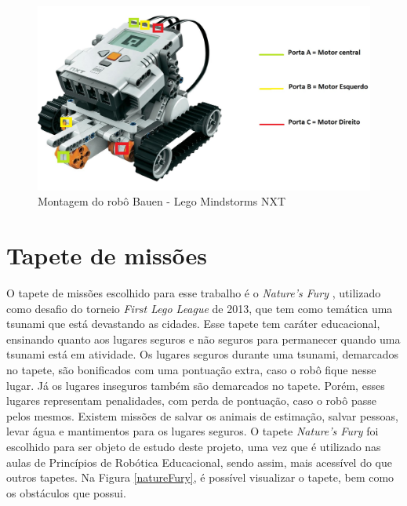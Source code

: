 \FloatBarrier
\begin{figure}[!h]
\centering
\includegraphics[keepaspectratio=true,scale=0.15]{figuras/bauen.jpg}
\caption{Montagem do robô Bauen - Lego Mindstorms NXT}
\label{bauen}
\end{figure}


\section{Tapete de missões} \label{tapeteDeMissoes}
O tapete de missões escolhido para esse trabalho é o \textit{Nature's Fury} \cite{challengeFury}, utilizado como desafio do torneio \textit{First Lego League} de 2013, que tem como temática uma tsunami que está devastando as cidades. Esse tapete tem caráter educacional, ensinando quanto aos lugares seguros e não seguros para permanecer quando uma tsunami está em atividade. Os lugares seguros durante uma tsunami, demarcados no tapete, são bonificados com uma pontuação extra, caso o robô fique nesse lugar. Já os lugares inseguros também são demarcados no tapete. Porém, esses lugares representam penalidades, com perda de pontuação, caso o robô passe pelos mesmos. Existem missões de salvar os animais de estimação, salvar pessoas, levar água e mantimentos para os lugares seguros.
O tapete \textit{Nature's Fury} foi escolhido para ser objeto de estudo deste projeto, uma vez que é utilizado nas aulas de Princípios de Robótica Educacional, sendo assim, mais acessível do que outros tapetes. Na Figura \ref{natureFury}, é possível visualizar o tapete, bem como os obstáculos que possui. 

